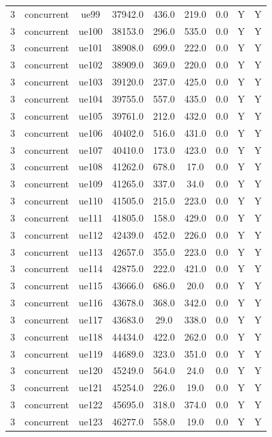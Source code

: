 \begin{table}[ht]
\begin{tabular}{|c|c|c|c|c|c|c|c|c|}
3 & concurrent & ue99 & 37942.0 & 436.0 & 219.0 & 0.0 & Y & Y \\
3 & concurrent & ue100 & 38153.0 & 296.0 & 535.0 & 0.0 & Y & Y \\
3 & concurrent & ue101 & 38908.0 & 699.0 & 222.0 & 0.0 & Y & Y \\
3 & concurrent & ue102 & 38909.0 & 369.0 & 220.0 & 0.0 & Y & Y \\
3 & concurrent & ue103 & 39120.0 & 237.0 & 425.0 & 0.0 & Y & Y \\
3 & concurrent & ue104 & 39755.0 & 557.0 & 435.0 & 0.0 & Y & Y \\
3 & concurrent & ue105 & 39761.0 & 212.0 & 432.0 & 0.0 & Y & Y \\
3 & concurrent & ue106 & 40402.0 & 516.0 & 431.0 & 0.0 & Y & Y \\
3 & concurrent & ue107 & 40410.0 & 173.0 & 423.0 & 0.0 & Y & Y \\
3 & concurrent & ue108 & 41262.0 & 678.0 & 17.0 & 0.0 & Y & Y \\
3 & concurrent & ue109 & 41265.0 & 337.0 & 34.0 & 0.0 & Y & Y \\
3 & concurrent & ue110 & 41505.0 & 215.0 & 223.0 & 0.0 & Y & Y \\
3 & concurrent & ue111 & 41805.0 & 158.0 & 429.0 & 0.0 & Y & Y \\
3 & concurrent & ue112 & 42439.0 & 452.0 & 226.0 & 0.0 & Y & Y \\
3 & concurrent & ue113 & 42657.0 & 355.0 & 223.0 & 0.0 & Y & Y \\
3 & concurrent & ue114 & 42875.0 & 222.0 & 421.0 & 0.0 & Y & Y \\
3 & concurrent & ue115 & 43666.0 & 686.0 & 20.0 & 0.0 & Y & Y \\
3 & concurrent & ue116 & 43678.0 & 368.0 & 342.0 & 0.0 & Y & Y \\
3 & concurrent & ue117 & 43683.0 & 29.0 & 338.0 & 0.0 & Y & Y \\
3 & concurrent & ue118 & 44434.0 & 422.0 & 262.0 & 0.0 & Y & Y \\
3 & concurrent & ue119 & 44689.0 & 323.0 & 351.0 & 0.0 & Y & Y \\
3 & concurrent & ue120 & 45249.0 & 564.0 & 24.0 & 0.0 & Y & Y \\
3 & concurrent & ue121 & 45254.0 & 226.0 & 19.0 & 0.0 & Y & Y \\
3 & concurrent & ue122 & 45695.0 & 318.0 & 374.0 & 0.0 & Y & Y \\
3 & concurrent & ue123 & 46277.0 & 558.0 & 19.0 & 0.0 & Y & Y \\

\end{tabular}
\end{table}
